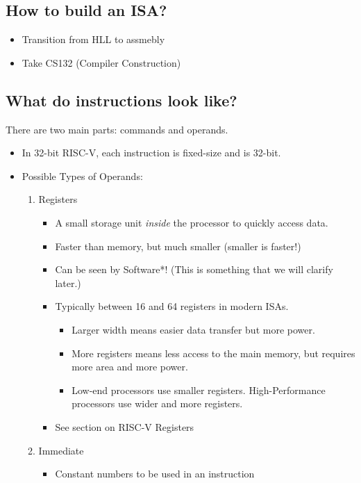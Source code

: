 \documentclass[10pt]{article}
\begin{document}
\subsection*{How to build an ISA?}
\begin{itemize}
    \item Transition from HLL to assmebly
    \item Take CS132 (Compiler Construction)
\end{itemize}
\subsection*{What do instructions look like?}
There are two main parts: commands and operands. 
\begin{itemize}
    \item In 32-bit RISC-V, each instruction is fixed-size and is 32-bit.
    \item Possible Types of Operands:
    \begin{enumerate}
        \item Registers
        \begin{itemize}
            \item A small storage unit \textit{inside} the processor to quickly access data.
            \item Faster than memory, but much smaller (smaller is faster!)
            \item Can be seen by Software*! (This is something that we will clarify later.)
            \item Typically between 16 and 64 registers in modern ISAs.
            \begin{itemize}
                \item Larger width means easier data transfer but more power.
                \item More registers means less access to the main memory, but requires more area and more power.
                \item Low-end processors use smaller registers.  High-Performance processors use wider and more registers.
            \end{itemize}
            \item See section on RISC-V Registers
        \end{itemize}
        \item Immediate
        \begin{itemize}
            \item Constant numbers to be used in an instruction

\end{itemize}
\end{enumerate}
\end{itemize}
\end{document}
